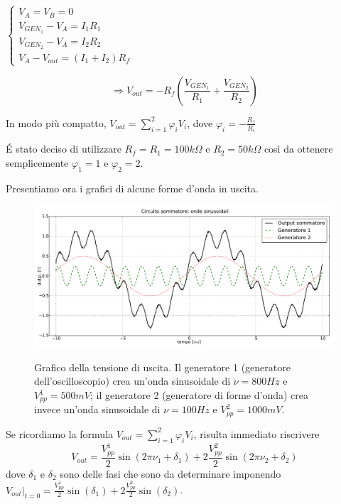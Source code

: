 $\begin{cases} V_A=V_B=0 \\ V_{{GEN}_1} - V_A =I_1 R_1  \\ V_{{GEN}_2} - V_A =I_2 R_2 \\ V_A - V_{out} =(I_1+I_2) R_f \end{cases} $


$$\Rightarrow V_{out}=-R_f \left( \frac{V_{{GEN}_1}}{R_1}+\frac{V_{{GEN}_2}}{R_2}\right)$$


In modo più compatto, $V_{out}=\sum^{2}_{i=1} \varphi_i V_{i}$, dove $\varphi_i=-\frac{R_f}{R_i}$ 

\'E stato deciso di utilizzare $R_f=R_1=100 k\Omega$ e $R_2=50 k\Omega$ così da ottenere semplicemente $\varphi_1=1$ e $\varphi_2=2$.

Presentiamo ora i grafici di alcune forme d'onda in uscita.

\begin{figure}[H]
 \centering
   {\includegraphics[width=18cm]{../E01/latex/sinsin.pdf}}
 \caption{Grafico della tensione di uscita. Il generatore 1 (generatore dell'oscilloscopio) crea un'onda sinusoidale di $\nu=800 Hz$ e $V^1_{pp}=500 mV$; il generatore 2 (generatore di forme d'onda) crea invece un'onda sinusoidale di $\nu=100 Hz$ e $V^2_{pp}=1000 mV$.}
 \label{gr:onde1}
\end{figure}

Se ricordiamo la formula $V_{out}=\sum^{2}_{i=1} \varphi_i V_{i}$, risulta immediato riscrivere 
\begin{equation}
V_{out}=\frac{V^1_{pp}}{2}\sin(2 \pi \nu_1+ \delta_1)+2\frac{V^2_{pp}}{2}\sin(2 \pi \nu_2+ \delta_2)
\label{eq:batt}
\end{equation}
dove $\delta_1$ e $\delta_2$ sono delle fasi che sono da determinare imponendo $V_{out} \vert_{t=0}=\frac{V^1_{pp}}{2}\sin(\delta_1)+2\frac{V^2_{pp}}{2}\sin(\delta_2)$. 


